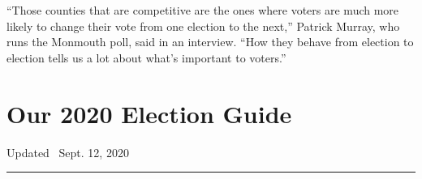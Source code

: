 ``Those counties that are competitive are the ones where voters are much
more likely to change their vote from one election to the next,''
Patrick Murray, who runs the Monmouth poll, said in an interview. ``How
they behave from election to election tells us a lot about what's
important to voters.''

\hypertarget{our-2020-election-guide}{%
\section{Our 2020 Election Guide}\label{our-2020-election-guide}}

Updated ~Sept. 12, 2020

\begin{center}\rule{0.5\linewidth}{\linethickness}\end{center}

